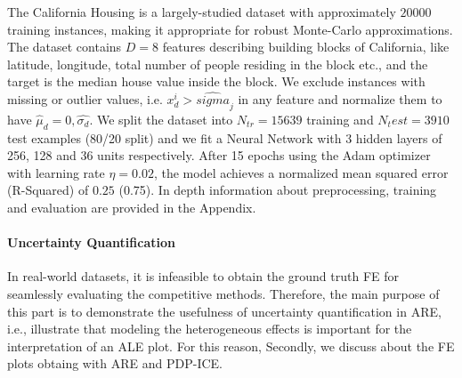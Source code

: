 \documentclass[twoside]{article}
\begin{document}
The California Housing is a largely-studied dataset with approximately
\(20000\) training instances, making it appropriate for robust
Monte-Carlo approximations. The dataset contains \(D=8\) features
describing building blocks of California, like latitude, longitude,
total number of people residing in the block etc., and the target is
the median house value inside the block. We exclude instances with
missing or outlier values, i.e. \(x_d^i > \hat{sigma}_j\) in any
feature and normalize them to have
\(\hat{\mu}_d = 0, \hat{\sigma_d}\). We split the dataset into
\(N_{tr} = 15639\) training and \(N_test = 3910\) test examples (80/20
split) and we fit a Neural Network with 3 hidden layers of 256, 128
and 36 units respectively. After 15 epochs using the Adam optimizer
with learning rate \(\eta = 0.02\), the model achieves a normalized
mean squared error (R-Squared) of \(0.25\) (0.75). In depth information
about preprocessing, training and evaluation are provided in the
Appendix.

\paragraph{Uncertainty Quantification}

In real-world datasets, it is infeasible to obtain the ground truth FE
for seamlessly evaluating the competitive methods. Therefore, the main
purpose of this part is to demonstrate the usefulness of uncertainty
quantification in ARE, i.e., illustrate that modeling the
heterogeneous effects is important for the interpretation of an ALE
plot. For this reason, Secondly, we discuss about the FE plots obtaing with ARE and
PDP-ICE.
\end{document}
